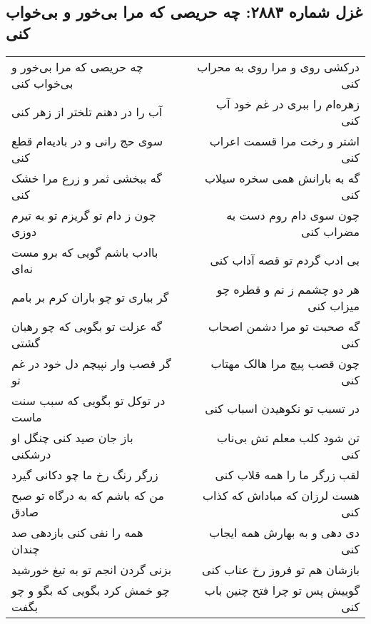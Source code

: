 \begin{center}
\section*{غزل شماره ۲۸۸۳: چه حریصی که مرا بی‌خور و بی‌خواب کنی}
\label{sec:2883}
\begin{longtable}{l p{0.5cm} r}
چه حریصی که مرا بی‌خور و بی‌خواب کنی
&&
درکشی روی و مرا روی به محراب کنی
\\
آب را در دهنم تلختر از زهر کنی
&&
زهره‌ام را ببری در غم خود آب کنی
\\
سوی حج رانی و در بادیه‌ام قطع کنی
&&
اشتر و رخت مرا قسمت اعراب کنی
\\
گه ببخشی ثمر و زرع مرا خشک کنی
&&
گه به بارانش همی سخره سیلاب کنی
\\
چون ز دام تو گریزم تو به تیرم دوزی
&&
چون سوی دام روم دست به مضراب کنی
\\
باادب باشم گویی که برو مست نه‌ای
&&
بی ادب گردم تو قصه آداب کنی
\\
گر بباری تو چو باران کرم بر بامم
&&
هر دو چشمم ز نم و قطره چو میزاب کنی
\\
گه عزلت تو بگویی که چو رهبان گشتی
&&
گه صحبت تو مرا دشمن اصحاب کنی
\\
گر قصب وار نپیچم دل خود در غم تو
&&
چون قصب پیچ مرا هالک مهتاب کنی
\\
در توکل تو بگویی که سبب سنت ماست
&&
در تسبب تو نکوهیدن اسباب کنی
\\
باز جان صید کنی چنگل او درشکنی
&&
تن شود کلب معلم تش بی‌ناب کنی
\\
زرگر رنگ رخ ما چو دکانی گیرد
&&
لقب زرگر ما را همه قلاب کنی
\\
من که باشم که به درگاه تو صبح صادق
&&
هست لرزان که مباداش که کذاب کنی
\\
همه را نفی کنی بازدهی صد چندان
&&
دی دهی و به بهارش همه ایجاب کنی
\\
بزنی گردن انجم تو به تیغ خورشید
&&
بازشان هم تو فروز رخ عناب کنی
\\
چو خمش کرد بگویی که بگو و چو بگفت
&&
گوییش پس تو چرا فتح چنین باب کنی
\\
\end{longtable}
\end{center}
